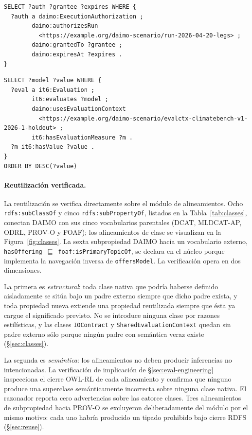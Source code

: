\documentclass[Afour,sagev,times]{sagej}
\newcommand{\code}[1]{\texttt{#1}}
\begin{document}
\begin{lstlisting}[label=lst:cq-g3,caption={CQ-G3: autorización de una ejecución concreta.}]
SELECT ?auth ?grantee ?expires WHERE {
  ?auth a daimo:ExecutionAuthorization ;
        daimo:authorizesRun
          <https://example.org/daimo-scenario/run-2026-04-20-legs> ;
        daimo:grantedTo ?grantee ;
        daimo:expiresAt ?expires .
}
\end{lstlisting}

\begin{lstlisting}[label=lst:cq-v3,caption={CQ-V3: ranking de modelos bajo un contexto compartido.}]
SELECT ?model ?value WHERE {
  ?eval a it6:Evaluation ;
        it6:evaluates ?model ;
        daimo:usesEvaluationContext
          <https://example.org/daimo-scenario/evalctx-climatebench-v1-2026-1-holdout> ;
        it6:hasEvaluationMeasure ?m .
  ?m it6:hasValue ?value .
}
ORDER BY DESC(?value)
\end{lstlisting}

\paragraph{Reutilización verificada.}\label{sec:eval-reuse}

La reutilización se verifica directamente sobre el módulo de alineamientos. Ocho \code{rdfs:subClassOf} y cinco \code{rdfs:subPropertyOf}, listados en la Tabla~\ref{tab:classes}, conectan DAIMO con sus cinco vocabularios parentales (DCAT, MLDCAT-AP, ODRL, PROV-O y FOAF); los alineamientos de clase se visualizan en la Figura~\ref{fig:classes}. La sexta subpropiedad DAIMO hacia un vocabulario externo, \code{hasOffering}~$\sqsubseteq$~\code{foaf:isPrimaryTopicOf}, se declara en el núcleo porque implementa la navegación inversa de \code{offersModel}. La verificación opera en dos dimensiones.

La primera es \emph{estructural}: toda clase nativa que podría haberse definido aisladamente se sitúa bajo un padre externo siempre que dicho padre exista, y toda propiedad nueva extiende una propiedad reutilizada siempre que ésta ya cargue el significado previsto. No se introduce ninguna clase por razones estilísticas, y las clases \code{IOContract} y \code{SharedEvaluationContext} quedan sin padre externo sólo porque ningún padre con semántica veraz existe (§\ref{sec:classes}).

La segunda es \emph{semántica}: los alineamientos no deben producir inferencias no intencionadas. La verificación de implicación de §\ref{sec:eval-engineering} inspecciona el cierre OWL-RL de cada alineamiento y confirma que ninguno produce una superclase semánticamente incorrecta sobre ninguna clase nativa. El razonador reporta cero advertencias sobre las catorce clases. Tres alineamientos de subpropiedad hacia PROV-O se excluyeron deliberadamente del módulo por el mismo motivo: cada uno habría producido un tipado prohibido bajo cierre RDFS (§\ref{sec:reuse}).
\end{document}
